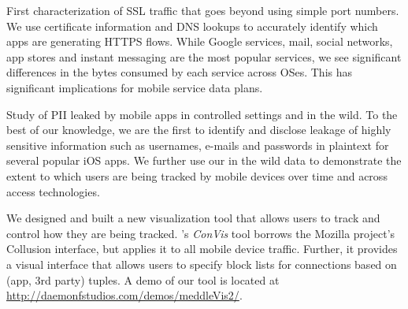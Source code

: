 First characterization of SSL traffic that goes beyond using simple port numbers. We use 
certificate information and DNS lookups to accurately identify which apps are generating HTTPS flows.
While Google services, mail, social networks, app stores and instant messaging are the most 
popular services, we see significant differences in the bytes consumed by each service across 
OSes. This has significant implications for mobile service data plans.

Study of PII leaked by mobile apps in controlled settings and in the wild. To the best of our knowledge, 
we are the first to identify and disclose leakage of highly sensitive information such as usernames, 
e-mails and passwords in plaintext for several popular iOS apps. We further use our in the wild 
data to demonstrate the extent to which users are being tracked by mobile devices over time 
and across access technologies. 

We designed and built a new visualization tool that allows users to track and control how 
they are being tracked. \platname{}'s \emph{ConVis} tool borrows the Mozilla project's Collusion 
interface, but applies it to all mobile device traffic. Further, it provides a visual interface that allows 
 users to specify block lists for connections based on (app, 3rd party) tuples. A demo of our tool is 
 located at \url{http://daemonfstudios.com/demos/meddleVis2/}.
 




